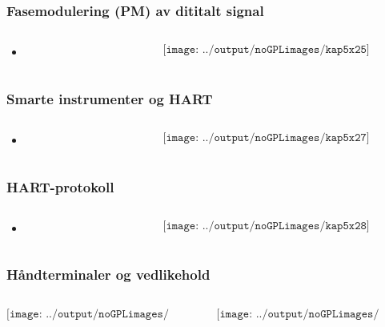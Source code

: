 \documentclass[aspectratio=169,xcolor=dvipsnames]{beamer}
\begin{document}
\begin{frame}
	\frametitle{Fasemodulering (PM) av dititalt signal}
	\begin{columns}
		\begin{column}{0.5\textwidth}

			\begin{itemize}
				\item      
			\end{itemize}

			
		\end{column}

		\begin{column}{0.5\textwidth}
	$$\texttt{[image: ../output/noGPLimages/kap5x25]}$$
		\end{column}
	\end{columns}
\end{frame}
\begin{frame}
	\frametitle{Smarte instrumenter og HART}
	\begin{columns}
		\begin{column}{0.5\textwidth}

			\begin{itemize}
				\item      
			\end{itemize}

			
		\end{column}

		\begin{column}{0.5\textwidth}
	$$\texttt{[image: ../output/noGPLimages/kap5x27]}$$
		\end{column}
	\end{columns}
\end{frame}
\begin{frame}
	\frametitle{HART-protokoll}
	\begin{columns}
		\begin{column}{0.5\textwidth}

			\begin{itemize}
				\item      
			\end{itemize}

			
		\end{column}

		\begin{column}{0.5\textwidth}
	$$\texttt{[image: ../output/noGPLimages/kap5x28]}$$
		\end{column}
	\end{columns}
\end{frame}
\begin{frame}
	\frametitle{Håndterminaler og vedlikehold}
	\begin{columns}
		\begin{column}{0.5\textwidth}

	$$\texttt{[image: ../output/noGPLimages/kap5x30]}$$

			
		\end{column}

		\begin{column}{0.5\textwidth}
	$$\texttt{[image: ../output/noGPLimages/kap5x29]}$$
		\end{column}
	\end{columns}
\end{frame}
\end{document}
